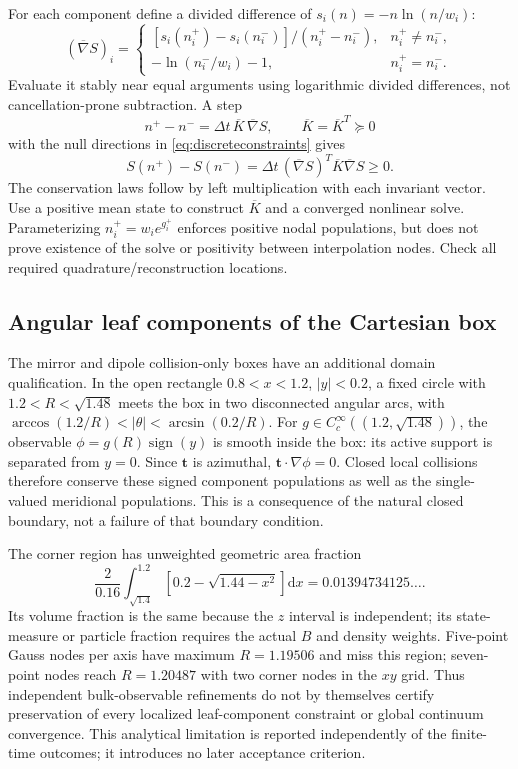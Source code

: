 \documentclass[11pt,letterpaper]{article}
\newcommand{\dd}{\mathrm d}
\begin{document}
For each component define a divided difference of $s_i(n)=-n\ln(n/w_i)$:
\begin{equation}
 (\overline\nabla S)_i=
 \begin{cases}
 [s_i(n_i^+)-s_i(n_i^-)]/(n_i^+-n_i^-),&n_i^+\ne n_i^-,\\
 -\ln(n_i^-/w_i)-1,&n_i^+=n_i^-.
 \end{cases}
 \label{eq:discretegradient}
\end{equation}
Evaluate it stably near equal arguments using logarithmic divided differences,
not cancellation-prone subtraction. A step
\begin{equation}
 n^+-n^-=\Delta t\,\overline K\,\overline\nabla S,
 \qquad \overline K=\overline K^T\succeq0
 \label{eq:discretestep}
\end{equation}
with the null directions in \eqref{eq:discreteconstraints} gives
\begin{equation}
 S(n^+)-S(n^-)=\Delta t\,
 (\overline\nabla S)^T\overline K\overline\nabla S\ge0.
\end{equation}
The conservation laws follow by left multiplication with each invariant vector.
Use a positive mean state to construct $\overline K$ and a converged nonlinear
solve. Parameterizing $n_i^+=w_i e^{g_i^+}$ enforces positive nodal populations,
but does not prove existence of the solve or positivity between interpolation
nodes. Check all required quadrature/reconstruction locations.

\subsection*{Angular leaf components of the Cartesian box}
The mirror and dipole collision-only boxes have an additional domain
qualification. In the open rectangle $0.8<x<1.2$, $|y|<0.2$, a fixed circle
with $1.2<R<\sqrt{1.48}$ meets the box in two disconnected angular arcs,
with $\arccos(1.2/R)<|\theta|<\arcsin(0.2/R)$.
For $g\in C_c^\infty((1.2,\sqrt{1.48}))$, the observable
$\phi=g(R)\operatorname{sign}(y)$ is smooth inside the box: its active support
is separated from $y=0$. Since $\mathbf t$ is azimuthal,
$\mathbf t\cdot\nabla\phi=0$. Closed local collisions therefore conserve
these signed component populations as well as the single-valued meridional
populations. This is a consequence of the natural closed boundary, not a
failure of that boundary condition.

The corner region has unweighted geometric area fraction
\begin{equation}
 \frac{2}{0.16}\int_{\sqrt{1.4}}^{1.2}
       [0.2-\sqrt{1.44-x^2}]\dd x
 =0.01394734125\ldots .
\end{equation}
Its volume fraction is the same because the $z$ interval is independent;
its state-measure or particle fraction requires the actual $B$ and density
weights. Five-point Gauss nodes per axis have maximum $R=1.19506$ and miss
this region; seven-point nodes reach $R=1.20487$ with two corner nodes in the
$xy$ grid. Thus independent bulk-observable refinements do not by themselves
certify preservation of every localized leaf-component constraint or global
continuum convergence. This analytical limitation is reported independently
of the finite-time outcomes; it introduces no later acceptance criterion.
\end{document}
